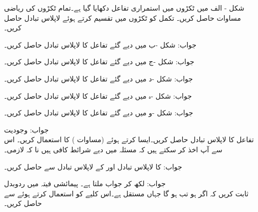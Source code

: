 شکل - الف    میں ٹکڑوں میں استمراری تفاعل دکھایا گیا ہے۔تمام ٹکڑوں کی ریاضی مساوات حاصل کریں۔ تکمل    کو ٹکڑوں میں تقسیم کرتے ہوئے لاپلاس تبادل حاصل کریں۔

جواب:
شکل -ب میں دیے گئے تفاعل کا لاپلاس تبادل حاصل کریں۔

جواب:
شکل -ج میں دیے گئے تفاعل کا لاپلاس تبادل حاصل کریں۔

جواب:
شکل -د    میں دیے گئے تفاعل کا لاپلاس تبادل حاصل کریں۔

جواب:
شکل -ہ   میں دیے گئے تفاعل کا لاپلاس تبادل حاصل کریں۔

جواب:
شکل -و  میں دیے گئے تفاعل کا لاپلاس تبادل حاصل کریں۔

جواب:
\quad وجودیت\\
تفاعل  کا لاپلاس تبادل حاصل کریں۔ایسا کرتے ہوئے  (مساوات ) کا استعمال کریں۔ اس سے آپ اخذ کر سکتے ہیں کہ مسئلہ  میں دیے شرائط کافی ہیں نا کہ لازمی۔

جواب:
 کا لاپلاس تبادل  اور  کے لاپلاس تبادل سے حاصل کریں۔

جواب: لکھ کر جواب  ملتا ہے۔
\quad پیمائشی فیتہ میں ردوبدل\\
ثابت کریں کہ اگر   ہو تب  ہو گا جہاں  مستقل ہے۔اس کلیے کو استعمال کرتے ہوئے  سے  حاصل کریں۔

